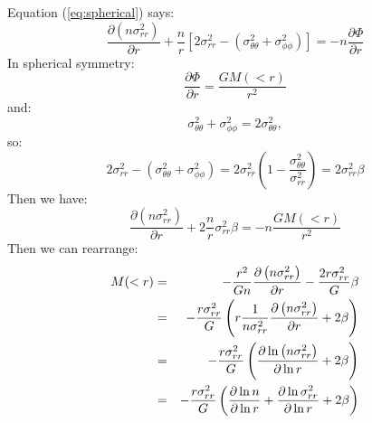 \begin{enumerate}
\begin{answer}
Equation (\ref{eq:spherical}) says:
\begin{equation}
\frac{\partial\left(n\sigma_{rr}^2\right)}{\partial r}
 + \frac{n}{r} \left[2 \sigma_{rr}^2 - \left(\sigma_{\theta\theta}^2
 + \sigma_{\phi\phi}^2\right)\right]
 = - n \frac{\partial \Phi}{\partial r}
\end{equation}
In spherical symmetry:
\begin{equation}
 \frac{\partial \Phi}{\partial r} = \frac{G M(<r)}{r^2}
\end{equation}
and:
\begin{equation}
 \sigma_{\theta\theta}^2 + \sigma_{\phi\phi}^2 =
 2\sigma_{\theta\theta}^2,
\end{equation}
so:
\begin{equation}
 2 \sigma_{rr}^2 - \left(\sigma_{\theta\theta}^2
 + \sigma_{\phi\phi}^2\right)
 = 2 \sigma_{rr}^2 \left(1 - \frac{\sigma_{\theta\theta}^2}{\sigma_{rr}^2}\right)
 = 2\sigma_{rr}^2 \beta
\end{equation}
Then we have:
\begin{equation}
\frac{\partial\left(n\sigma_{rr}^2\right)}{\partial r}
 + 2 \frac{n}{r} \sigma_{rr}^2 \beta
 = - n \frac{G M(<r)}{r^2}
\end{equation}
Then we can rearrange:
\begin{eqnarray}
 M(<r) &=&
 - \frac{r^2}{Gn} \frac{\partial\left(n \sigma_{rr}^2\right)}{\partial
 r}
  - \frac{2 r \sigma_{rr}^2}{G}\beta \cr
 &=&
 - \frac{r \sigma_{rr}^2}{G} \left(r
  \frac{1}{n\sigma_{rr}^2} \frac{\partial\left(n \sigma_{rr}^2\right)}{\partial r}
   + 2\beta \right) \cr
 &=&
 - \frac{r \sigma_{rr}^2}{G} \left(
  \frac{\partial\ln \left(n \sigma_{rr}^2\right)}{\partial \ln r}
   + 2\beta \right) \cr
 &=&
 - \frac{r \sigma_{rr}^2}{G} \left(
  \frac{\partial\ln n}{\partial \ln r}
  + \frac{\partial\ln \sigma_{rr}^2}{\partial \ln r}
   + 2\beta \right) 
\end{eqnarray}



\end{answer}


\end{enumerate}
